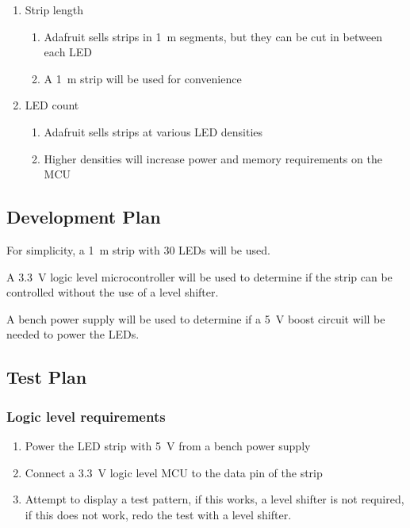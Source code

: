 \documentclass{notes}
\begin{document}
\begin{enumerate}
    \item Strip length
    \begin{enumerate}
        \item Adafruit sells strips in \SI{1}{\meter} segments, but they can be cut in between each LED
        \item A \SI{1}{\meter} strip will be used for convenience
    \end{enumerate}
    \item LED count
    \begin{enumerate}
        \item Adafruit sells strips at various LED densities
        \item Higher densities will increase power and memory requirements on the MCU
    \end{enumerate}
\end{enumerate}

\subsection{Development Plan}

For simplicity, a \SI{1}{\meter} strip with 30 LEDs will be used.

A \SI{3.3}{\volt} logic level microcontroller will be used to determine if the strip can be controlled without the use of a level shifter.

A bench power supply will be used to determine if a \SI{5}{\volt} boost circuit will be needed to power the LEDs.

\subsection{Test Plan}
\label{sec:fr1testplan}

\subsubsection{Logic level requirements}
\begin{enumerate}
    \item Power the LED strip with \SI{5}{\volt} from a bench power supply
    \item Connect a \SI{3.3}{\volt} logic level MCU to the data pin of the strip
    \item Attempt to display a test pattern, if this works, a level shifter is not required, if this does not work, redo the test with a level shifter.
\end{enumerate}
\end{document}
